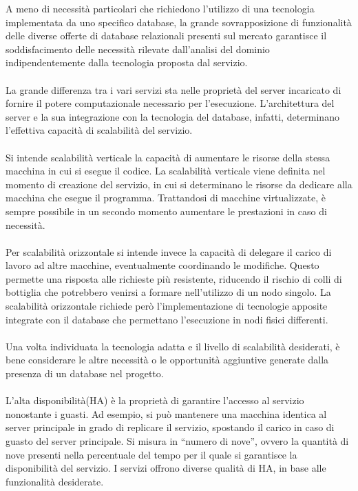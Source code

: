 A meno di necessità particolari che richiedono l’utilizzo di una tecnologia implementata da uno specifico database, 
la grande sovrapposizione di funzionalità delle diverse offerte di database relazionali presenti sul mercato garantisce 
il  soddisfacimento delle necessità rilevate dall’analisi del dominio indipendentemente dalla tecnologia proposta dal servizio.\\
\\
La grande differenza tra i vari servizi sta nelle proprietà del server incaricato di fornire il potere computazionale necessario per l’esecuzione. 
L’architettura del server e la sua integrazione con la tecnologia del database, infatti, determinano l’effettiva capacità di scalabilità del servizio.\\
\\
Si intende scalabilità verticale la capacità di aumentare le risorse della stessa macchina in cui si esegue il codice. 
La scalabilità verticale viene definita nel momento di creazione del servizio, in cui si determinano le risorse da dedicare alla macchina che esegue il programma. 
Trattandosi di macchine virtualizzate, è sempre possibile in un secondo momento aumentare le prestazioni in caso di necessità.\\
\\

Per scalabilità orizzontale si intende invece la capacità di delegare il carico di lavoro ad altre macchine, eventualmente coordinando le modifiche. 
Questo permette una risposta alle richieste più resistente, riducendo il rischio di colli di bottiglia che potrebbero venirsi a formare nell’utilizzo di un nodo singolo.
La scalabilità orizzontale richiede però l’implementazione di tecnologie apposite integrate con il database che permettano l’esecuzione in nodi fisici differenti. \\
\\
Una volta individuata la tecnologia adatta e il livello di scalabilità desiderati, 
è bene considerare le altre necessità o le opportunità aggiuntive generate dalla presenza di un database nel progetto. \\
\\

L’alta disponibilità(HA) è la proprietà di garantire l’accesso al servizio nonostante i guasti. 
Ad esempio, si può mantenere una macchina identica al server principale in grado di replicare il servizio, spostando il carico in caso di guasto del server principale. 
Si misura in “numero di nove”, ovvero la quantità di nove presenti nella percentuale del tempo per il quale si garantisce la disponibilità del servizio.
I servizi offrono diverse qualità di HA, in base alle funzionalità desiderate.\\
\\

